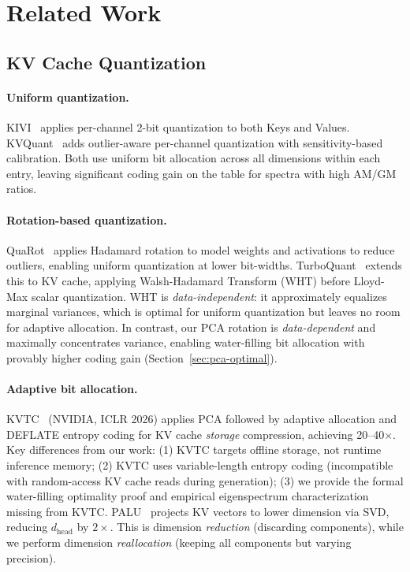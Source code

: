 \section{Related Work}
\label{sec:related}

\subsection{KV Cache Quantization}

\paragraph{Uniform quantization.}
KIVI~\citep{kivi2024} applies per-channel 2-bit quantization to both Keys and Values.
KVQuant~\citep{kvquant2024} adds outlier-aware per-channel quantization with sensitivity-based calibration.
Both use uniform bit allocation across all dimensions within each entry, leaving significant coding gain on the table for spectra with high AM/GM ratios.

\paragraph{Rotation-based quantization.}
QuaRot~\citep{quarot2024} applies Hadamard rotation to model weights and activations to reduce outliers, enabling uniform quantization at lower bit-widths.
TurboQuant~\citep{turboquant2026} extends this to KV cache, applying Walsh-Hadamard Transform (WHT) before Lloyd-Max scalar quantization.
WHT is \emph{data-independent}: it approximately equalizes marginal variances, which is optimal for uniform quantization but leaves no room for adaptive allocation.
In contrast, our PCA rotation is \emph{data-dependent} and maximally concentrates variance, enabling water-filling bit allocation with provably higher coding gain (Section~\ref{sec:pca-optimal}).

\paragraph{Adaptive bit allocation.}
KVTC~\citep{kvtc2026} (NVIDIA, ICLR 2026) applies PCA followed by adaptive allocation and DEFLATE entropy coding for KV cache \emph{storage} compression, achieving 20--40$\times$.
Key differences from our work: (1) KVTC targets offline storage, not runtime inference memory; (2) KVTC uses variable-length entropy coding (incompatible with random-access KV cache reads during generation); (3) we provide the formal water-filling optimality proof and empirical eigenspectrum characterization missing from KVTC.
PALU~\citep{palu2024} projects KV vectors to lower dimension via SVD, reducing $d_{\text{head}}$ by $2\times$.
This is dimension \emph{reduction} (discarding components), while we perform dimension \emph{reallocation} (keeping all components but varying precision).

